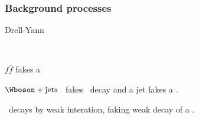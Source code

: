 \begin{frame}
\frametitle{Background processes}
\begin{block}{Drell-Yann}
\hfill
\begin{minipage}[c]{.45\textwidth}
\vspace{\baselineskip}



~
\end{minipage}
\hfill
\begin{minipage}[c]{.4\linewidth}
$f\bar{f}$ fakes a \leptau\antitau
\end{minipage}
\end{block}

\begin{block}{$\Wboson+\text{jets}$}
\Wboson\ fakes \tau\ decay and a jet fakes a \tauh.
\end{block}

\begin{block}{\quarkt\antiquarkt}
\quarkt\ decays by weak interation, faking weak decay of a \tau.
\end{block}

\end{frame}
